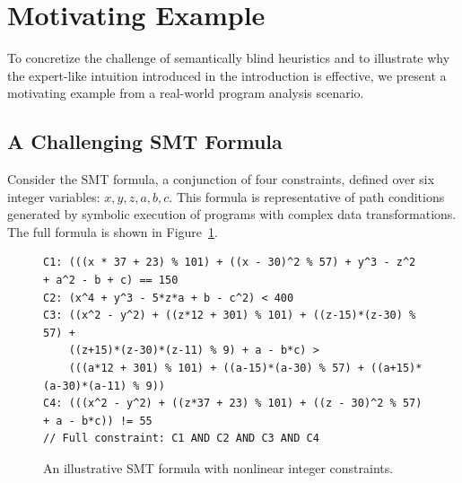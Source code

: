 \section{Motivating Example}
\label{sec:motivating-example}

To concretize the challenge of semantically blind heuristics and to illustrate why the expert-like intuition introduced in the introduction is effective, we present a motivating example from a real-world program analysis scenario.

\subsection{A Challenging SMT Formula}

Consider the SMT formula, a conjunction of four constraints, defined over six integer variables: $x, y, z, a, b, c$. This formula is representative of path conditions generated by symbolic execution of programs with complex data transformations. The full formula is shown in Figure~\ref{fig:motivating-smt}.


\begin{figure}[t]
\centering
{}
\caption{An illustrative SMT formula with nonlinear integer constraints.}
\label{fig:motivating-smt}
\begin{lstlisting}[language={},
  basicstyle=\ttfamily\normalsize,
  frame=single,
  framerule=0.4pt,
  framesep=4pt,
  framexrightmargin=10pt,
  xrightmargin=10pt,
  breaklines=false,
  breakatwhitespace=false,
  aboveskip=0.5pt,
  belowskip=0.5pt,
  columns=fullflexible,
  keepspaces=true,
  captionpos=b]
C1: (((x * 37 + 23) % 101) + ((x - 30)^2 % 57) + y^3 - z^2 + a^2 - b + c) == 150
C2: (x^4 + y^3 - 5*z*a + b - c^2) < 400
C3: ((x^2 - y^2) + ((z*12 + 301) % 101) + ((z-15)*(z-30) % 57) + 
    ((z+15)*(z-30)*(z-11) % 9) + a - b*c) > 
    (((a*12 + 301) % 101) + ((a-15)*(a-30) % 57) + ((a+15)*(a-30)*(a-11) % 9))
C4: (((x^2 - y^2) + ((z*37 + 23) % 101) + ((z - 30)^2 % 57) + a - b*c)) != 55
// Full constraint: C1 AND C2 AND C3 AND C4
\end{lstlisting}
\end{figure}

